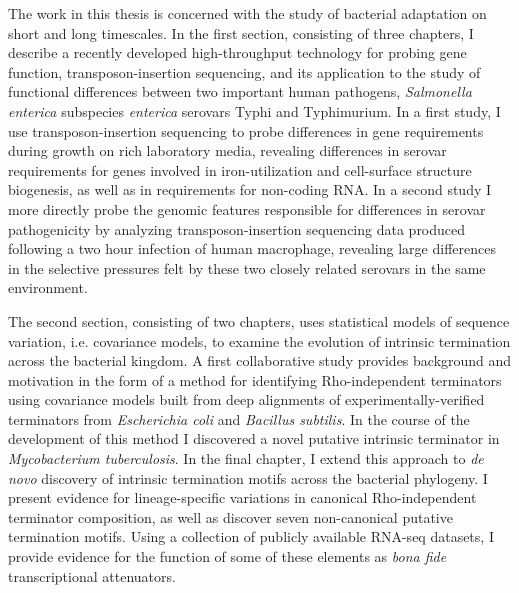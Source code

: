 


\begin{abstracts}        %

The work in this thesis is concerned with the study of bacterial adaptation on short and long timescales. In the first section, consisting of three chapters, I describe a recently developed high-throughput technology for probing gene function, transposon-insertion sequencing, and its application to the study of functional differences between two important human pathogens, \textit{Salmonella enterica} subspecies \textit{enterica} serovars Typhi and Typhimurium. In a first study, I use transposon-insertion sequencing to probe differences in gene requirements during growth on rich laboratory media, revealing differences in serovar requirements for genes involved in iron-utilization and cell-surface structure biogenesis, as well as in requirements for non-coding RNA. In a second study I more directly probe the genomic features responsible for differences in serovar pathogenicity by analyzing transposon-insertion sequencing data produced following a two hour infection of human macrophage, revealing large differences in the selective pressures felt by these two closely related serovars in the same environment.

The second section, consisting of two chapters, uses statistical models of sequence variation, i.e. covariance models, to examine the evolution of intrinsic termination across the bacterial kingdom. A first collaborative study provides background and motivation in the form of a method for identifying Rho-independent terminators using covariance models built from deep alignments of experimentally-verified terminators from \textit{Escherichia coli} and \textit{Bacillus subtilis}. In the course of the development of this method I discovered a novel putative intrinsic terminator in \textit{Mycobacterium tuberculosis}. In the final chapter, I extend this approach to \textit{de novo} discovery of intrinsic termination motifs across the bacterial phylogeny. I present evidence for lineage-specific variations in canonical Rho-independent terminator composition, as well as discover seven non-canonical putative termination motifs. Using a collection of publicly available RNA-seq datasets, I provide evidence for the function of some of these elements as \textit{bona fide} transcriptional attenuators.

\end{abstracts}




